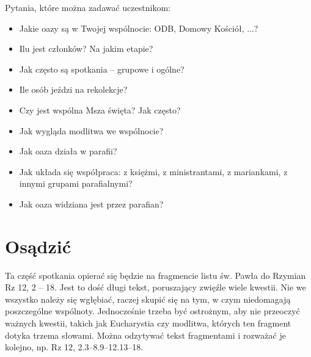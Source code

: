 \documentclass[a5paper,10pt,polish]{book}
\begin{document}
Pytania, które można zadawać uczestnikom:
\begin{itemize}
\item {} 
Jakie oazy są w Twojej wspólnocie: ODB, Domowy Kościół, ...?

\item {} 
Ilu jest członków? Na jakim etapie?

\item {} 
Jak często są spotkania – grupowe i ogólne?

\item {} 
Ile osób jeździ na rekolekcje?

\item {} 
Czy jest wspólna Msza święta? Jak często?

\item {} 
Jak wygląda modlitwa we wspólnocie?

\item {} 
Jak oaza działa w parafii?

\item {} 
Jak układa się współpraca: z księżmi, z ministrantami, z mariankami, z innymi grupami parafialnymi?

\item {} 
Jak oaza widziana jest przez parafian?

\end{itemize}


\section{Osądzić}
\label{babice2006-jesien-gliwice/spotkanie3:osadzic}
Ta część  spotkania opierać się będzie na fragmencie  listu św. Pawła do Rzymian Rz  12, 2 – 18. Jest to dość długi tekst, poruszający  zwięźle wiele kwestii. Nie we wszystko należy się wgłębiać, raczej skupić się na tym, w czym niedomagają poszczególne wspólnoty. Jednocześnie trzeba być ostrożnym, aby nie przeoczyć ważnych kwestii, takich jak Eucharystia czy modlitwa, których ten fragment dotyka trzema słowami. Można odzytywać tekst fragmentami i rozważać je kolejno, np. Rz 12, 2.3–8.9–12.13–18.
\end{document}
